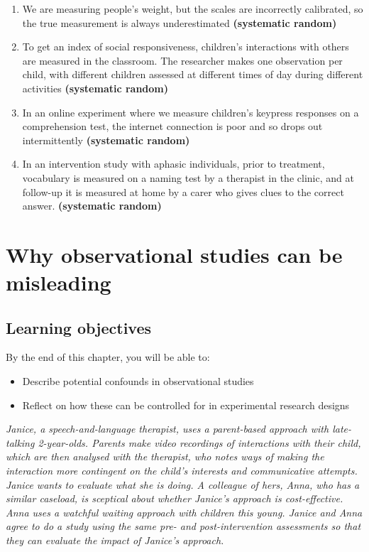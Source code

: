 \documentclass{krantz}
\providecommand{\tightlist}{%
\setlength{\itemsep}{0pt}\setlength{\parskip}{0pt}}
\begin{document}
\begin{enumerate}
\def\labelenumi{\arabic{enumi}.}
\tightlist
\item
  We are measuring people's weight, but the scales are incorrectly calibrated, so the true measurement is always underestimated \textbf{(systematic \textbar{} random)}\\
\item
  To get an index of social responsiveness, children's interactions with others are measured in the classroom. The researcher makes one observation per child, with different children assessed at different times of day during different activities \textbf{(systematic \textbar{} random)}\\
\item
  In an online experiment where we measure children's keypress responses on a comprehension test, the internet connection is poor and so drops out intermittently \textbf{(systematic \textbar{} random)}\\
\item
  In an intervention study with aphasic individuals, prior to treatment, vocabulary is measured on a naming test by a therapist in the clinic, and at follow-up it is measured at home by a carer who gives clues to the correct answer. \textbf{(systematic \textbar{} random)}
\end{enumerate}

\hypertarget{observations}{%
\chapter{Why observational studies can be misleading}\label{observations}}

\hypertarget{learning-objectives-1}{%
\section{Learning objectives}\label{learning-objectives-1}}

By the end of this chapter, you will be able to:

\begin{itemize}
\item
  Describe potential confounds in observational studies
\item
  Reflect on how these can be controlled for in experimental research designs
\end{itemize}

\begin{shaded}
\textit{Janice, a speech-and-language therapist, uses a parent-based approach with late-talking 2-year-olds. Parents make video recordings of interactions with their child, which are then analysed with the therapist, who notes ways of making the interaction more contingent on the child's interests and communicative attempts. Janice wants to evaluate what she is doing. A colleague of hers, Anna, who has a similar caseload, is sceptical about whether Janice's approach is cost-effective. Anna uses a watchful waiting approach with children this young. Janice and Anna agree to do a study using the same pre- and post-intervention assessments so that they can evaluate the impact of Janice's approach.}  
\end{shaded}
\end{document}
